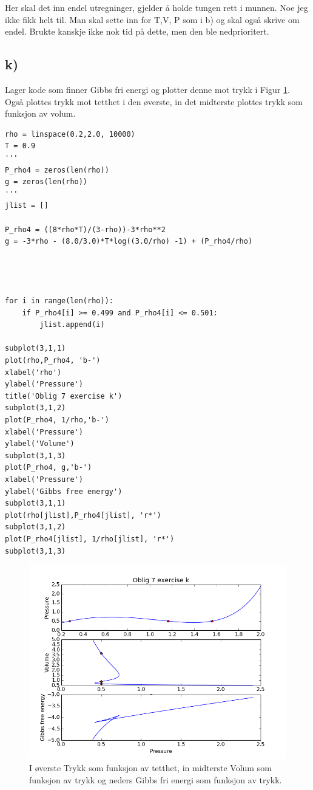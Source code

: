 \documentclass[12pt]{article}
\begin{document}
Her skal det inn endel utregninger, gjelder å holde tungen rett i munnen. Noe jeg ikke fikk helt til. Man skal sette inn for T,V, P som i b) og skal også skrive om endel. Brukte kanskje ikke nok tid på dette, men den ble nedprioritert. 

\subsection*{k)}

Lager kode som finner Gibbs fri energi og plotter denne mot trykk i Figur \ref{fig:3}. Også plottes trykk mot tetthet i den øverste, in det midterste plottes trykk som funksjon av volum. 

\begin{lstlisting}
rho = linspace(0.2,2.0, 10000)
T = 0.9
'''
P_rho4 = zeros(len(rho))
g = zeros(len(rho))
'''
jlist = []

P_rho4 = ((8*rho*T)/(3-rho))-3*rho**2
g = -3*rho - (8.0/3.0)*T*log((3.0/rho) -1) + (P_rho4/rho)




for i in range(len(rho)):
    if P_rho4[i] >= 0.499 and P_rho4[i] <= 0.501:
        jlist.append(i)
        
subplot(3,1,1)
plot(rho,P_rho4, 'b-')
xlabel('rho')
ylabel('Pressure')
title('Oblig 7 exercise k')
subplot(3,1,2)
plot(P_rho4, 1/rho,'b-')
xlabel('Pressure')
ylabel('Volume')
subplot(3,1,3)
plot(P_rho4, g,'b-')
xlabel('Pressure')
ylabel('Gibbs free energy')
subplot(3,1,1)
plot(rho[jlist],P_rho4[jlist], 'r*')
subplot(3,1,2)
plot(P_rho4[jlist], 1/rho[jlist], 'r*')
subplot(3,1,3)
\end{lstlisting}

\begin{figure}[ht!]
\includegraphics[width = \textwidth]{figure_3.png}
\caption{I øverste Trykk som funksjon av tetthet, in midterste Volum som funksjon av trykk og neders Gibbs fri energi som funksjon av trykk.}
\label{fig:3}
\end{figure}
\end{document}
